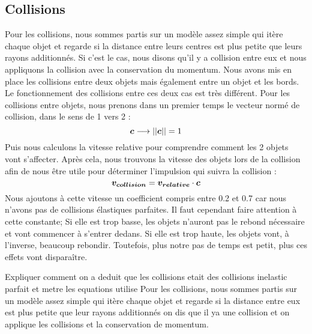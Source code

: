 
\subsection{Collisions}

    Pour les collisions, nous sommes partis sur un modèle assez simple qui itère chaque objet et regarde si la distance entre leurs centres est plus petite que leurs rayons additionnés. Si c'est le cas, nous disons qu'il y a collision entre eux et nous appliquons la collision avec la conservation du momentum. Nous avons mis en place les collisions entre deux objets mais également entre un objet et les bords. Le fonctionnement des collisions entre ces deux cas est très différent. Pour les collisions entre objets, nous prenons dans un premier temps le vecteur normé de collision, dans le sens de 1 vers 2 :
    \begin{equation}
        \vb*{c}\longrightarrow ||\vb*{c}|| = 1
    \end{equation}
    Puis nous calculons la vitesse relative pour comprendre comment les 2 objets vont s'affecter. Après cela, nous trouvons la vitesse des objets lors de la collision afin de nous être utile pour déterminer l'impulsion qui suivra la collision :
    \begin{equation}
        \vb*{v_{collision}}=\vb*{v_{relative}}\cdot\vb*{c}
    \end{equation}
    Nous ajoutons à cette vitesse un coefficient compris entre 0.2 et 0.7 car nous n'avons pas de collisions élastiques parfaites. Il faut cependant faire attention à cette constante; Si elle est trop basse, les objets n'auront pas le rebond nécessaire et vont commencer à s'entrer dedans. Si elle est trop haute, les objets vont, à l'inverse, beaucoup rebondir. Toutefois, plus notre pas de temps est petit, plus ces effets vont disparaître.


    Expliquer comment on a deduit que les collisions etait des collisions inelastic parfait et metre les equations utilise
    Pour les collisions, nous sommes partis sur un modèle assez simple qui itère chaque objet et regarde si la distance entre eux est plus petite que leur rayons additionnés on dis que il ya une collision et on applique les collisions et la conservation de momentum.


